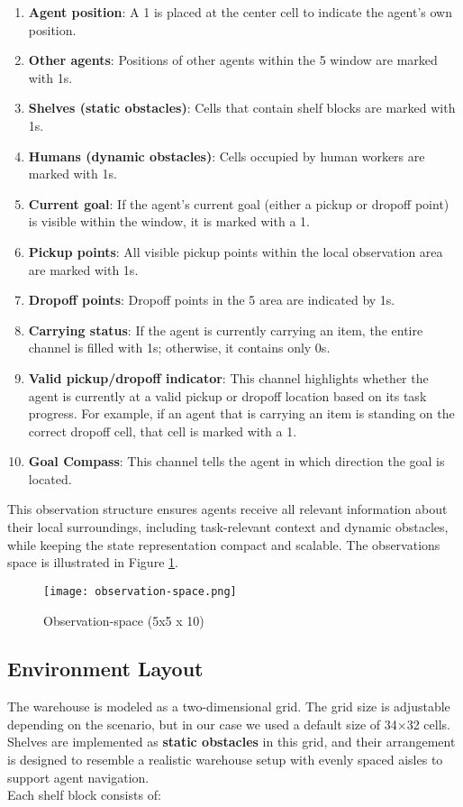 \documentclass{kththesis}
\begin{document}
\begin{enumerate}
\item \textbf{Agent position}: A 1 is placed at the center cell to indicate the agent's own position.
\item \textbf{Other agents}: Positions of other agents within the 5 window are marked with 1s.
\item \textbf{Shelves (static obstacles)}: Cells that contain shelf blocks are marked with 1s.
\item \textbf{Humans (dynamic obstacles)}: Cells occupied by human workers are marked with 1s.
\item \textbf{Current goal}: If the agent's current goal (either a pickup or dropoff point) is visible within the window, it is marked with a 1.
\item \textbf{Pickup points}: All visible pickup points within the local observation area are marked with 1s.
\item \textbf{Dropoff points}: Dropoff points in the 5 area are indicated by 1s.
\item \textbf{Carrying status}: If the agent is currently carrying an item, the entire channel is filled with 1s; otherwise, it contains only 0s.
\item \textbf{Valid pickup/dropoff indicator}: This channel highlights whether the agent is currently at a valid pickup or dropoff location based on its task progress. For example, if an agent that is carrying an item is standing on the correct dropoff cell, that cell is marked with a 1.
\item \textbf{Goal Compass}: This channel tells the agent in which direction the goal is located. 
\end{enumerate}

This observation structure ensures agents receive all relevant information about their local surroundings, including task-relevant context and dynamic obstacles, while keeping the state representation compact and scalable. The observations space is illustrated in Figure \ref{Observation-space}.

\begin{figure}
    \centering
    \texttt{[image: observation-space.png]}
    \caption{Observation-space (5x5 x 10)}
    \label{Observation-space}
\end{figure}


\subsection{Environment Layout}
The warehouse is modeled as a two-dimensional grid. The grid size is adjustable depending on the scenario, but in our case we used a default size of 34×32 cells. Shelves are implemented as \textbf{static obstacles} in this grid, and their arrangement is designed to resemble a realistic warehouse setup with evenly spaced aisles to support agent navigation.
\\
Each shelf block consists of: 
\end{document}
